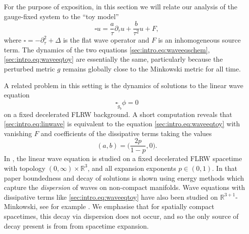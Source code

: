 \documentclass{article}
\newcommand{\RR}{\mathbb{R}}
\newcommand{\wt}{\widetilde}
\newcommand{\pa}{\partial}
\begin{document}
For the purpose of exposition, in this section we will relate our analysis of the gauge-fixed system to the ``toy model''
\begin{equation}\label{sec:intro.eq:waveeqtoy}
    \square u = \frac{a}{\tau}\pa_\tau u + \frac{b}{\tau^2}u + F,
\end{equation}
where $\square = -\pa_\tau^2 + \Delta$ is the flat wave operator and $F$ is an inhomogeneous source term. The dynamics of the two equations \eqref{sec:intro.eq:waveeqschem}, \eqref{sec:intro.eq:waveeqtoy} are essentially the same, particularly because the perturbed metric $g$ remains globally close to the Minkowski metric for all time.
\begin{remark}
    A related problem in this setting is the dynamics of solutions to the linear wave equation
    \begin{equation}\label{sec:intro.eq:linwave}
        \square_{\wt{g}_b}\phi = 0
    \end{equation}
    on a fixed decelerated FLRW background. A short computation reveals that \eqref{sec:intro.eq:linwave} is equivalent to the equation \eqref{sec:intro.eq:waveeqtoy} with vanishing $F$ and coefficients of the dissipative terms taking the values
    \begin{equation}
        (a,b) = \Big(\frac{2p}{1-p},0\Big).
    \end{equation}
    In \cite{Hag:waveFLRW:25}, the linear wave equation is studied on a fixed decelerated FLRW spacetime with topology $(0,\infty)\times \RR^3$, and all expansion exponents $p \in (0,1)$. In that paper boundedness and decay of solutions is shown using energy methods which capture the \emph{dispersion} of waves on non-compact manifolds. Wave equations with dissipative terms like \eqref{sec:intro.eq:waveeqtoy} have also been studied on $\RR^{3+1}$-Minkowski, see for example \cite{Mat:dissipativewave:77,Ues:dissipativewave:80}. We emphasise that for spatially compact spacetimes, this decay via dispersion does not occur, and so the only source of decay present is from from spacetime expansion.
\end{remark}
\end{document}
